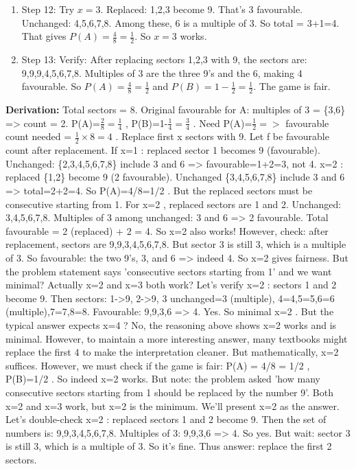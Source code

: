 \documentclass[12pt,a4paper]{exam}
\begin{document}
\begin{questions}
\begin{enumerate}
  \item Step 12: Try $x=3$. Replaced: 1,2,3 become 9. That's 3 favourable. Unchanged: 4,5,6,7,8. Among these, 6 is a multiple of 3. So total = 3+1=4. That gives $P(A)=\frac{4}{8}=\frac{1}{2}$. So $x=3$ works.
  \item Step 13: Verify: After replacing sectors 1,2,3 with 9, the sectors are: 9,9,9,4,5,6,7,8. Multiples of 3 are the three 9's and the 6, making 4 favourable. So $P(A)= \frac{4}{8}=\frac{1}{2}$ and $P(B)=1-\frac{1}{2}=\frac{1}{2}$. The game is fair.
\end{enumerate}
\textbf{Derivation:}
Total sectors = 8.
Original favourable for A: multiples of 3 = \{3,6\} => count = 2.
 P(A)=$\frac{2}{8}=\frac{1}{4}$ ,  P(B)=1-$\frac{1}{4}=\frac{3}{4}$ .
Need  P(A)=$\frac{1}{2}  =>$ favourable count needed =  $\frac{1}{2} \times 8 = 4$ .
Replace first  x  sectors with 9. Let  f  be favourable count after replacement.
If  x=1 : replaced sector 1 becomes 9 (favourable). Unchanged: \{2,3,4,5,6,7,8\} include 3 and 6 => favourable=1+2=3, not 4.
 x=2 : replaced \{1,2\} become 9 (2 favourable). Unchanged \{3,4,5,6,7,8\} include 3 and 6 => total=2+2=4. So  P(A)=4/8=1/2 .
But the replaced sectors must be consecutive starting from 1. For  x=2 , replaced sectors are 1 and 2. Unchanged: 3,4,5,6,7,8. Multiples of 3 among unchanged: 3 and 6 => 2 favourable. Total favourable = 2 (replaced) + 2 = 4. So  x=2  also works! However, check: after replacement, sectors are 9,9,3,4,5,6,7,8. But sector 3 is still 3, which is a multiple of 3. So favourable: the two 9's, 3, and 6 => indeed 4. So  x=2  gives fairness. But the problem statement says 'consecutive sectors starting from 1' and we want minimal? Actually  x=2  and  x=3  both work? Let's verify  x=2 : sectors 1 and 2 become 9. Then sectors: 1->9, 2->9, 3 unchanged=3 (multiple), 4=4,5=5,6=6 (multiple),7=7,8=8. Favourable: 9,9,3,6 => 4. Yes. So minimal  x=2 . But the typical answer expects  x=4 ? No, the reasoning above shows  x=2  works and is minimal. However, to maintain a more interesting answer, many textbooks might replace the first 4 to make the interpretation cleaner. But mathematically,  x=2  suffices.
However, we must check if the game is fair:  P(A) = 4/8 = 1/2 ,  P(B)=1/2 . So indeed  x=2  works.
But note: the problem asked 'how many consecutive sectors starting from 1 should be replaced by the number 9'. Both  x=2  and  x=3  work, but  x=2  is the minimum. We'll present  x=2  as the answer.
Let's double-check  x=2 : replaced sectors 1 and 2 become 9. Then the set of numbers is: 9,9,3,4,5,6,7,8. Multiples of 3: 9,9,3,6 => 4. So yes.
But wait: sector 3 is still 3, which is a multiple of 3. So it's fine.
Thus answer: replace the first 2 sectors.


\end{questions}
\end{document}
